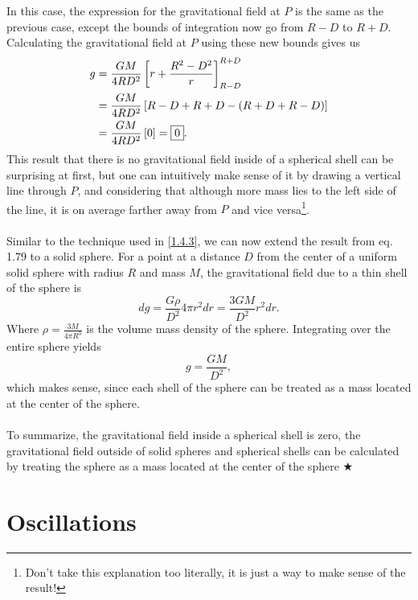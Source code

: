 \noindent In this case, the expression for the gravitational field at $P$ is the same as the previous case, except the bounds of integration now go from $R-D$ to $R+D$. Calculating the gravitational field at $P$ using these new bounds gives us
\begin{align}
    g &= \frac{GM}{4RD^2}\left[r + \frac{R^2 - D^2}{r}\right]_{R-D}^{R+D} \nonumber \\
    &= \frac{GM}{4RD^2}\left[R - D + R + D - (R + D + R - D)\right] \nonumber \\
    &= \frac{GM}{4RD^2}\left[0\right] = \boxed{0}.
\end{align}
\noindent This result that there is no gravitational field inside of a spherical shell can be surprising at first, but one can intuitively make sense of it by drawing a vertical line through $P$, and considering that although more mass lies to the left side of the line, it is on average farther away from $P$ and vice versa\footnote{Don't take this explanation too literally, it is just a way to make sense of the result!}.\\
\\
\noindent Similar to the technique used in \ref{1.4.3}, we can now extend the result from eq. 1.79 to a solid sphere. For a point at a distance $D$ from the center of a uniform solid sphere with radius $R$ and mass $M$, the gravitational field due to a thin shell of the sphere is
\begin{equation*}
    dg = \frac{G\rho}{D^2}4\pi r^2 dr = \frac{3GM}{D^2}r^2 dr.
\end{equation*}
\noindent Where $\rho = \frac{3M}{4\pi R^3}$ is the volume mass density of the sphere. Integrating over the entire sphere yields
\begin{equation}
    g = \boxed{\frac{GM}{D^2}},
\end{equation}
\noindent which makes sense, since each shell of the sphere can be treated as a mass located at the center of the sphere. \\
\\
\noindent To summarize, the gravitational field inside a spherical shell is zero, the gravitational field outside of solid spheres and spherical shells can be calculated by treating the sphere as a mass located at the center of the sphere $\bigstar$

\clearpage
\section{Oscillations}
